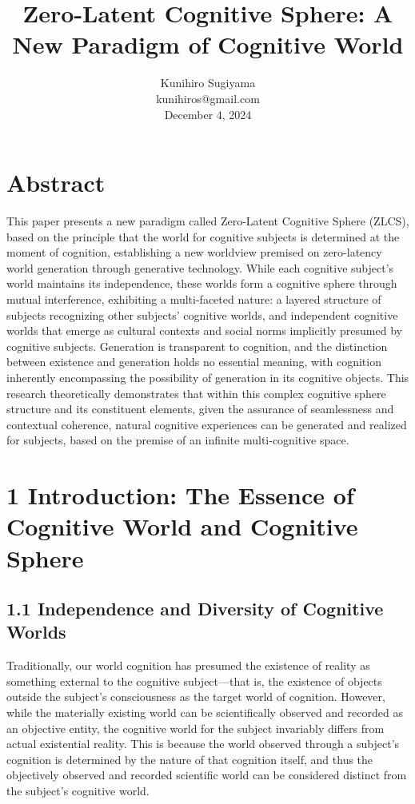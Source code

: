 \documentclass{article}
\title{Zero-Latent Cognitive Sphere: A New Paradigm of Cognitive World}
\author{Kunihiro Sugiyama \\ kunihiros@gmail.com \\ December 4, 2024}
\date{}
\begin{document}
\maketitle

\section*{Abstract}

This paper presents a new paradigm called Zero-Latent Cognitive Sphere (ZLCS), based on the principle that the world for cognitive subjects is determined at the moment of cognition, establishing a new worldview premised on zero-latency world generation through generative technology. While each cognitive subject's world maintains its independence, these worlds form a cognitive sphere through mutual interference, exhibiting a multi-faceted nature: a layered structure of subjects recognizing other subjects' cognitive worlds, and independent cognitive worlds that emerge as cultural contexts and social norms implicitly presumed by cognitive subjects. Generation is transparent to cognition, and the distinction between existence and generation holds no essential meaning, with cognition inherently encompassing the possibility of generation in its cognitive objects. This research theoretically demonstrates that within this complex cognitive sphere structure and its constituent elements, given the assurance of seamlessness and contextual coherence, natural cognitive experiences can be generated and realized for subjects, based on the premise of an infinite multi-cognitive space.

\section{1 Introduction: The Essence of Cognitive World and Cognitive Sphere}

\subsection{1.1 Independence and Diversity of Cognitive Worlds}

Traditionally, our world cognition has presumed the existence of reality as something external to the cognitive subject—that is, the existence of objects outside the subject's consciousness as the target world of cognition. However, while the materially existing world can be scientifically observed and recorded as an objective entity, the cognitive world for the subject invariably differs from actual existential reality. This is because the world observed through a subject's cognition is determined by the nature of that cognition itself, and thus the objectively observed and recorded scientific world can be considered distinct from the subject's cognitive world.
\end{document}
